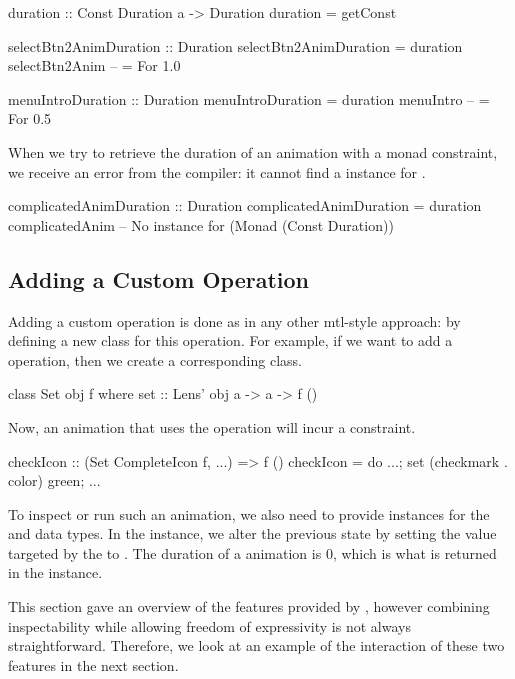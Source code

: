 \begin{code}
duration :: Const Duration a -> Duration
duration = getConst

selectBtn2AnimDuration :: Duration
selectBtn2AnimDuration = duration selectBtn2Anim -- = For 1.0

menuIntroDuration :: Duration
menuIntroDuration = duration menuIntro -- = For 0.5
\end{code}

When we try to retrieve the duration of an animation with a monad constraint,
we receive an error from the compiler: it cannot find a  instance for
.

\begin{spec}
complicatedAnimDuration :: Duration
complicatedAnimDuration = duration complicatedAnim
-- No instance for (Monad (Const Duration))
\end{spec}

\subsection{Adding a Custom Operation}

Adding a custom operation is done as in any other mtl-style approach: by defining a new class for this operation. For example, if we want to add a  operation, then we create a corresponding  class.

\begin{code}
class Set obj f where set :: Lens' obj a -> a -> f ()
\end{code}

Now, an animation that uses the  operation will incur a  constraint.

\begin{code}
checkIcon :: (Set CompleteIcon f, ...) => f ()
checkIcon = do ...; set (checkmark . color) green; ...
\end{code}

To inspect or run such an animation, we also need to provide instances for the  and  data types. In the  instance, we alter the previous state by setting the value targeted by the  to . The duration of a  animation is 0, which is what is returned in the  instance.


This section gave an overview of the features provided by \dsl{}, however combining inspectability while allowing freedom of expressivity is not always straightforward. Therefore, we look at an example of the interaction of these two features in the next section.
